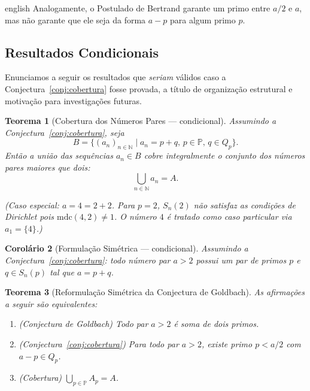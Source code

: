 \documentclass[a4paper,11pt]{article}
\newtheorem{theorem}{Teorema}[section]
\newtheorem{corollary}[theorem]{Corolário}
\theoremstyle{definition}
\theoremstyle{remark}
\begin{document}
\begin{otherlanguage*}{english}
		Analogamente, o Postulado de Bertrand garante um primo entre $a/2$ e $a$,
		mas não garante que ele seja da forma $a - p$ para algum primo $p$.
		
		\subsection{Resultados Condicionais}
		
		Enunciamos a seguir os resultados que \emph{seriam} válidos caso a
		Conjectura~\ref{conj:cobertura} fosse provada, a título de organização
		estrutural e motivação para investigações futuras.
		
		\begin{theorem}[Cobertura dos Números Pares — condicional]%
			\label{teo:cobertura_dos_pares}
			Assumindo a Conjectura~\ref{conj:cobertura}, seja
			\[
			B = \{(a_n)_{n \in \mathbb{N}} \mid a_n = p + q,\, p \in \mathbb{P},\,
			q \in Q_p\}.
			\]
			Então a união das sequências $a_n \in B$ cobre integralmente o conjunto
			dos números pares maiores que dois:
			\[
			\bigcup_{n \in \mathbb{N}} a_n = A.
			\]
			
			\emph{(Caso especial: $a = 4 = 2 + 2$. Para $p = 2$, $S_n(2)$ não satisfaz
				as condições de Dirichlet pois $\mathrm{mdc}(4,2) \neq 1$. O número $4$
				é tratado como caso particular via $a_1 = \{4\}$.)}
		\end{theorem}
		
		\begin{corollary}[Formulação Simétrica — condicional]\label{coro:par_simetrico_primos}
			Assumindo a Conjectura~\ref{conj:cobertura}: todo número par $a > 2$
			possui um par de primos $p$ e $q \in S_n(p)$ tal que $a = p + q$.
		\end{corollary}
		
		\begin{theorem}[Reformulação Simétrica da Conjectura de Goldbach]%
			\label{teo:goldbach_por_simetria_de_primos}
			As afirmações a seguir são equivalentes:
			\begin{enumerate}[label=(\roman*)]
				\item \emph{(Conjectura de Goldbach)} Todo par $a > 2$ é soma de dois
				primos.
				\item \emph{(Conjectura~\ref{conj:cobertura})} Para todo par $a > 2$,
				existe primo $p < a/2$ com $a - p \in Q_p$.
				\item \emph{(Cobertura)} $\bigcup_{p \in \mathbb{P}} A_p = A$.
			\end{enumerate}
		\end{theorem}
		

\end{otherlanguage*}
\end{document}
